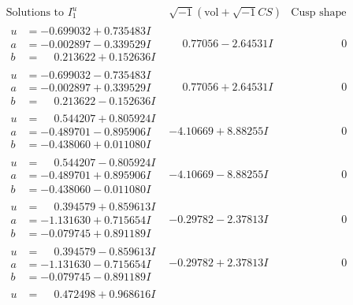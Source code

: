 \documentclass[1p]{elsarticle_modified}
\theoremstyle{definition}
\newcommand{\I}{\sqrt{-1}}
\begin{document}
$$\begin{array}{c|c|c}  
\text{Solutions to }I^u_{1}& \I (\text{vol} + \sqrt{-1}CS) & \text{Cusp shape}\\
 \hline 
\begin{aligned}
u &= -0.699032 + 0.735483 I \\
a &= -0.002897 - 0.339529 I \\
b &= \phantom{-}0.213622 + 0.152636 I\end{aligned}
 & \phantom{-}0.77056 - 2.64531 I & \phantom{-0.000000 } 0 \\ \hline\begin{aligned}
u &= -0.699032 - 0.735483 I \\
a &= -0.002897 + 0.339529 I \\
b &= \phantom{-}0.213622 - 0.152636 I\end{aligned}
 & \phantom{-}0.77056 + 2.64531 I & \phantom{-0.000000 } 0 \\ \hline\begin{aligned}
u &= \phantom{-}0.544207 + 0.805924 I \\
a &= -0.489701 - 0.895906 I \\
b &= -0.438060 + 0.011080 I\end{aligned}
 & -4.10669 + 8.88255 I & \phantom{-0.000000 } 0 \\ \hline\begin{aligned}
u &= \phantom{-}0.544207 - 0.805924 I \\
a &= -0.489701 + 0.895906 I \\
b &= -0.438060 - 0.011080 I\end{aligned}
 & -4.10669 - 8.88255 I & \phantom{-0.000000 } 0 \\ \hline\begin{aligned}
u &= \phantom{-}0.394579 + 0.859613 I \\
a &= -1.131630 + 0.715654 I \\
b &= -0.079745 + 0.891189 I\end{aligned}
 & -0.29782 - 2.37813 I & \phantom{-0.000000 } 0 \\ \hline\begin{aligned}
u &= \phantom{-}0.394579 - 0.859613 I \\
a &= -1.131630 - 0.715654 I \\
b &= -0.079745 - 0.891189 I\end{aligned}
 & -0.29782 + 2.37813 I & \phantom{-0.000000 } 0 \\ \hline\begin{aligned}
u &= \phantom{-}0.472498 + 0.968616 I \\

\end{aligned}
\end{array}$$
\end{document}
